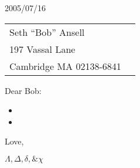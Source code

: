 \documentclass[11pt]{article}%
\def\docdate{2005/07/16}%
\begin{document}
\thispagestyle{first}

\docdate
\medskip

\begin{tabular*}{\columnwidth}{@{\extracolsep{\fill}}lr}%
  Seth ``Bob'' Ansell &\\
  197 Vassal Lane \\
  Cambridge MA 02138-6841
\end{tabular*}
\medskip

Dear Bob:

\begin{multicols}{2}

\lipsum[2-5]

\begin{itemize}
\item \lipsum[6]
\item \lipsum[7]
\end{itemize}

\lipsum[8-9]

\end{multicols}

Love,

\vspace{1cm}

{\large $\Lambda, \Delta, \delta, \& \chi$}

\vspace{3ex}

\hbox{
%
\vtop{\hsize=0.9\linewidth \lipsum[10]}%
}
\end{document}
